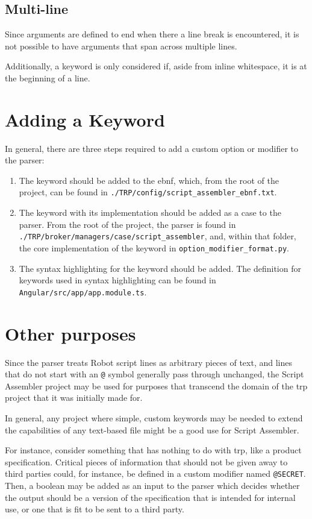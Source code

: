 \subsection{Multi-line}

Since arguments are defined to end when there a line break is encountered, it is not possible to have arguments that span across multiple lines.

Additionally, a keyword is only considered if, aside from inline whitespace, it is at the beginning of a line. 

\section{Adding a Keyword}

In general, there are three steps required to add a custom option or modifier to the parser:
\begin{enumerate}
    \item The keyword should be added to the \gls{ebnf}, which, from the root of the project, can be found in \verb|./TRP/config/script_assembler_ebnf.txt|.
    \item The keyword with its implementation should be added as a case to the parser. From the root of the project, the parser is found in \\\verb|./TRP/broker/managers/case/script_assembler|, and, within that folder, the core implementation of the keyword in \verb|option_modifier_format.py|. 
    \item The syntax highlighting for the keyword should be added. The definition for keywords used in syntax highlighting can be found in \\\verb|Angular/src/app/app.module.ts|. 
\end{enumerate}

\section{Other purposes}

Since the parser treats Robot script lines as arbitrary pieces of text, and lines that do not start with an \verb|@| symbol generally pass through unchanged, the Script Assembler project may be used for purposes that transcend the domain of the \gls{trp} project that it was initially made for. 

In general, any project where simple, custom keywords may be needed to extend the capabilities of any text-based file might be a good use for Script Assembler. 

For instance, consider something that has nothing to do with \gls{trp}, like a product specification. Critical pieces of information that should not be given away to third parties could, for instance, be defined in a custom modifier named \verb|@SECRET|. Then, a boolean may be added as an input to the parser which decides whether the output should be a version of the specification that is intended for internal use, or one that is fit to be sent to a third party. 
